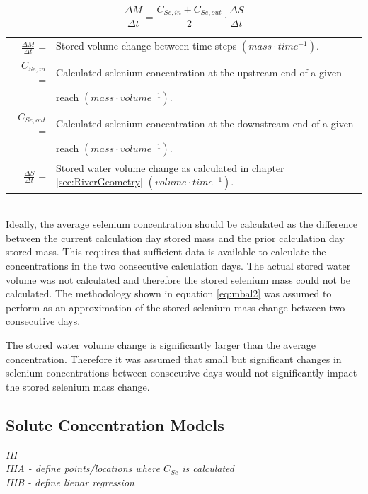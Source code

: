 \begin{linenumbers}
\begin{equation}
\frac{\Delta M}{\Delta t}=\frac{C_{Se,in}+C_{Se,out}}{2} \cdot \frac{\Delta S}{\Delta t}
\label{eq:mbal2}
\end{equation}
\begin{tabular}{rl}
$\frac{\Delta M}{\Delta t}$ =&Stored volume change between time steps $(mass \cdot time^{-1})$.\\
$C_{Se,in}$ =& Calculated selenium concentration at the upstream end of a given\\
&reach $(mass \cdot volume^{-1})$.\\
$C_{Se,out}$ =& Calculated selenium concentration at the downstream end of a given\\
&reach $(mass \cdot volume^{-1})$.\\
$\frac{\Delta S}{\Delta t}$ =& Stored water volume change as calculated in chapter \ref{sec:RiverGeometry} $(volume \cdot time^{-1})$.\\
\end{tabular}\\

Ideally, the average selenium concentration should be calculated as the difference between the current calculation day stored mass and the prior calculation day stored mass.  This requires that sufficient data is available to calculate the concentrations in the two consecutive calculation days.  The actual stored water volume was not calculated and therefore the stored selenium mass could not be calculated.  The methodology shown in equation \ref{eq:mbal2} was assumed to perform as an approximation of the stored selenium mass change between two consecutive days.

The stored water volume change is significantly larger than the average concentration.  Therefore it was assumed that small but significant changes in selenium concentrations between consecutive days would not significantly impact the stored selenium mass change.

\clearpage{}
\subsection{Solute Concentration Models}
\emph{III}\\

\emph{IIIA - define points/locations where $C_{Se}$ is calculated}\\

\emph{IIIB - define lienar regression}\\


\end{linenumbers}
